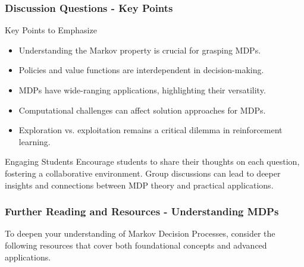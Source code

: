 \documentclass[aspectratio=169]{beamer}
\begin{document}
\begin{frame}[fragile]
    \frametitle{Discussion Questions - Key Points}
    \begin{block}{Key Points to Emphasize}
        \begin{itemize}
            \item Understanding the Markov property is crucial for grasping MDPs.
            \item Policies and value functions are interdependent in decision-making.
            \item MDPs have wide-ranging applications, highlighting their versatility.
            \item Computational challenges can affect solution approaches for MDPs.
            \item Exploration vs. exploitation remains a critical dilemma in reinforcement learning.
        \end{itemize}
    \end{block}

    \begin{block}{Engaging Students}
        Encourage students to share their thoughts on each question, fostering a collaborative environment. Group discussions can lead to deeper insights and connections between MDP theory and practical applications.
    \end{block}
\end{frame}

\begin{frame}[fragile]
    \frametitle{Further Reading and Resources - Understanding MDPs}
    To deepen your understanding of Markov Decision Processes, consider the following resources that cover both foundational concepts and advanced applications.
\end{frame}
\end{document}
